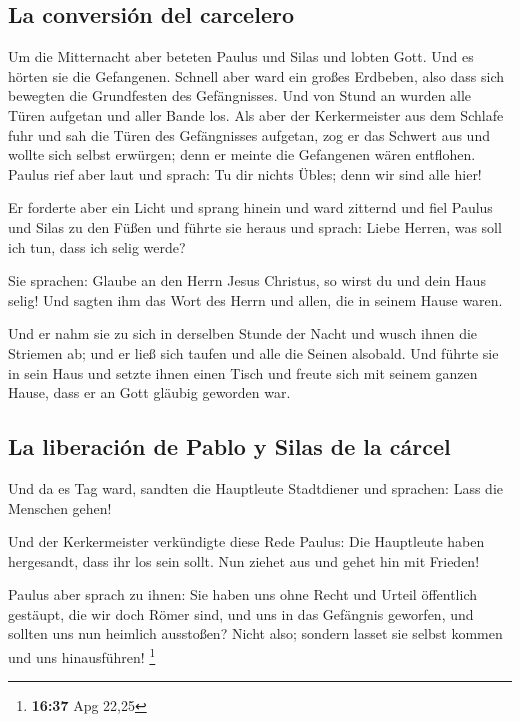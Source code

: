 \hypertarget{la-conversiuxf3n-del-carcelero}{%
\subsection{La conversión del
carcelero}\label{la-conversiuxf3n-del-carcelero}}

 Um die Mitternacht aber beteten Paulus und Silas und
lobten Gott. Und es hörten sie die Gefangenen.  Schnell
aber ward ein großes Erdbeben, also dass sich bewegten die Grundfesten
des Gefängnisses. Und von Stund an wurden alle Türen aufgetan und aller
Bande los.  Als aber der Kerkermeister aus dem Schlafe
fuhr und sah die Türen des Gefängnisses aufgetan, zog er das Schwert aus
und wollte sich selbst erwürgen; denn er meinte die Gefangenen wären
entflohen.  Paulus rief aber laut und sprach: Tu dir
nichts Übles; denn wir sind alle hier!

 Er forderte aber ein Licht und sprang hinein und ward
zitternd und fiel Paulus und Silas zu den Füßen  und
führte sie heraus und sprach: Liebe Herren, was soll ich tun, dass ich
selig werde?

 Sie sprachen: Glaube an den Herrn Jesus Christus, so
wirst du und dein Haus selig!  Und sagten ihm das Wort
des Herrn und allen, die in seinem Hause waren.

 Und er nahm sie zu sich in derselben Stunde der Nacht
und wusch ihnen die Striemen ab; und er ließ sich taufen und alle die
Seinen alsobald.  Und führte sie in sein Haus und setzte
ihnen einen Tisch und freute sich mit seinem ganzen Hause, dass er an
Gott gläubig geworden war.

\hypertarget{la-liberaciuxf3n-de-pablo-y-silas-de-la-cuxe1rcel}{%
\subsection{La liberación de Pablo y Silas de la
cárcel}\label{la-liberaciuxf3n-de-pablo-y-silas-de-la-cuxe1rcel}}

 Und da es Tag ward, sandten die Hauptleute Stadtdiener
und sprachen: Lass die Menschen gehen!

 Und der Kerkermeister verkündigte diese Rede Paulus: Die
Hauptleute haben hergesandt, dass ihr los sein sollt. Nun ziehet aus und
gehet hin mit Frieden!

 Paulus aber sprach zu ihnen: Sie haben uns ohne Recht
und Urteil öffentlich gestäupt, die wir doch Römer sind, und uns in das
Gefängnis geworfen, und sollten uns nun heimlich ausstoßen? Nicht also;
sondern lasset sie selbst kommen und uns hinausführen! \footnote{\textbf{16:37}
  Apg 22,25}

